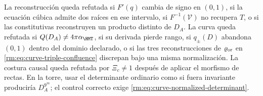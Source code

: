 \begin{falsifierbox}
La reconstrucci\'on queda refutada si \(F'(q)\) cambia de signo en
\((0,1)\), si la ecuaci\'on c\'ubica admite dos ra\'ices en ese intervalo, si
\(F^{-1}(\mathcal V)\) no recupera \(T\), o si las constitutivas reconstruyen
un producto distinto de \(D_A\). La curva queda refutada si
\(Q(D_A)\ne4\pi\alpha_{\HMT}\), si su derivada pierde rango, si
\(q_\pm(D)\) abandona \((0,1)\) dentro del dominio declarado, o si las tres
reconstrucciones de \(\varrho_{\rm or}\) en
\cref{rm:eq:curve-triple-confluence} discrepan bajo una misma normalizaci\'on.
La costura causal queda refutada por \(\Xi_c\ne1\) despu\'es de aplicar el
morfismo de rectas. En la torre, usar el determinante ordinario como si fuera
invariante producir\'ia \(D_A^{9^m}\); el control correcto exige
\cref{rm:eq:curve-normalized-determinant}.
\end{falsifierbox}
